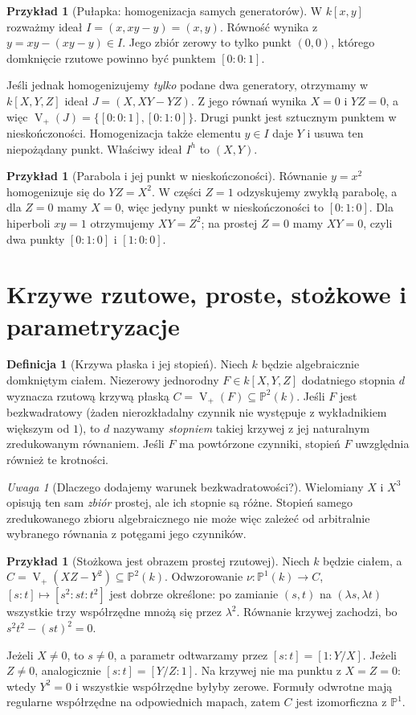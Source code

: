 \documentclass[11pt,a4paper,openany]{report}
\numberwithin{equation}{section}
\theoremstyle{plain}
\theoremstyle{definition}
\newtheorem{definicja}[twierdzenie]{Definicja}
\newtheorem{przyklad}[twierdzenie]{Przykład}
\theoremstyle{remark}
\newtheorem{uwaga}[twierdzenie]{Uwaga}
\newcommand{\PP}{\mathbb P}
\newcommand{\V}{\operatorname V}
\begin{document}
\begin{przyklad}[Pułapka: homogenizacja samych generatorów]
W $k[x,y]$ rozważmy ideał
$I=(x,xy-y)=(x,y)$. Równość wynika z
$y=xy-(xy-y)\in I$. Jego zbiór zerowy to tylko punkt $(0,0)$,
którego domknięcie rzutowe powinno być punktem $[0:0:1]$.

Jeśli jednak homogenizujemy \emph{tylko} podane dwa generatory,
otrzymamy w $k[X,Y,Z]$ ideał
$J=(X,XY-YZ)$. Z jego równań wynika $X=0$ i $YZ=0$,
a więc $\V_+(J)=\{[0:0:1],[0:1:0]\}$.
Drugi punkt jest sztucznym punktem w nieskończoności.
Homogenizacja także elementu $y\in I$ daje $Y$ i usuwa
ten niepożądany punkt. Właściwy ideał $I^h$ to $(X,Y)$.
\end{przyklad}

\begin{przyklad}[Parabola i jej punkt w nieskończoności]
Równanie $y=x^2$ homogenizuje się do $YZ=X^2$.
W części $Z=1$ odzyskujemy zwykłą parabolę, a dla $Z=0$
mamy $X=0$, więc jedyny punkt w nieskończoności to $[0:1:0]$.
Dla hiperboli $xy=1$ otrzymujemy $XY=Z^2$;
na prostej $Z=0$ mamy $XY=0$, czyli dwa punkty
$[0:1:0]$ i $[1:0:0]$.
\end{przyklad}

\section{Krzywe rzutowe, proste, stożkowe i parametryzacje}

\begin{definicja}[Krzywa płaska i jej stopień]
Niech $k$ będzie algebraicznie domkniętym ciałem.
Niezerowy jednorodny $F\in k[X,Y,Z]$ dodatniego stopnia $d$
wyznacza rzutową krzywą płaską $C=\V_+(F)\subseteq\PP^2(k)$.
Jeśli $F$ jest bezkwadratowy (żaden nierozkładalny czynnik
nie występuje z wykładnikiem większym od $1$), to $d$
nazywamy \emph{stopniem} takiej krzywej z jej naturalnym
zredukowanym równaniem. Jeśli $F$ ma powtórzone czynniki,
stopień $F$ uwzględnia również te krotności.
\end{definicja}

\begin{uwaga}[Dlaczego dodajemy warunek bezkwadratowości?]
Wielomiany $X$ i $X^3$ opisują ten sam \emph{zbiór} prostej,
ale ich stopnie są różne. Stopień samego zredukowanego
zbioru algebraicznego nie może więc zależeć od arbitralnie
wybranego równania z potęgami jego czynników.
\end{uwaga}

\begin{przyklad}[Stożkowa jest obrazem prostej rzutowej]
Niech $k$ będzie ciałem, a $C=\V_+(XZ-Y^2)\subseteq\PP^2(k)$.
Odwzorowanie
$\nu:\PP^1(k)\to C$, $[s:t]\mapsto[s^2:st:t^2]$
jest dobrze określone: po zamianie $(s,t)$ na
$(\lambda s,\lambda t)$ wszystkie trzy współrzędne
mnożą się przez $\lambda^2$. Równanie krzywej zachodzi,
bo $s^2t^2-(st)^2=0$.

Jeżeli $X\ne0$, to $s\ne0$, a parametr odtwarzamy przez
$[s:t]=[1:Y/X]$. Jeżeli $Z\ne0$, analogicznie
$[s:t]=[Y/Z:1]$. Na krzywej nie ma punktu z $X=Z=0$:
wtedy $Y^2=0$ i wszystkie współrzędne byłyby zerowe.
Formuły odwrotne mają regularne współrzędne na odpowiednich
mapach, zatem $C$ jest izomorficzna z $\PP^1$.
\end{przyklad}
\end{document}
